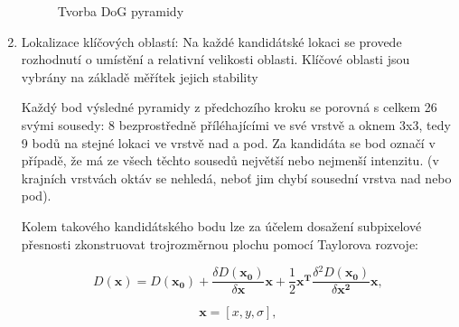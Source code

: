 \begin{enumerate}
		\begin{figure}[htp] 
			\caption{Tvorba DoG pyramidy} 	\label{sift_dog}
		\end{figure} 
			
		\item Lokalizace klíčových oblastí: Na každé kandidátské lokaci se provede rozhodnutí o umístění a relativní velikosti oblasti. Klíčové oblasti jsou vybrány na základě měřítek jejich stability
		
			Každý bod výsledné pyramidy z předchozího kroku se porovná s celkem 26 svými sousedy: 8 bezprostředně příléhajícími ve své vrstvě a oknem 3x3, tedy 9 bodů na stejné lokaci ve vrstvě nad a pod. Za kandidáta se bod označí v případě, že má ze všech těchto sousedů největší nebo nejmenší intenzitu. (v krajních vrstvách oktáv se nehledá, neboť jim chybí sousední vrstva nad nebo pod).
			
			Kolem takového kandidátského bodu lze za účelem dosažení subpixelové přesnosti zkonstruovat trojrozměrnou plochu pomocí Taylorova rozvoje:
			
			\begin{equation}
			\label{rozvoj}
			D(\mathbf{x}) = D(\mathbf{x_0}) + \frac{\delta D(\mathbf{x_0})}{\delta \mathbf{x}} \mathbf{x} + \frac{1}{2} \mathbf{x^T}\frac{\delta{}^2 D(\mathbf{x_0})}{\delta{}\mathbf{x^2}}\mathbf{x}, 
			\end{equation}
			
			\begin{equation} \mathbf{x} = [x, y, \sigma{}], \end{equation}
	

\end{enumerate}
